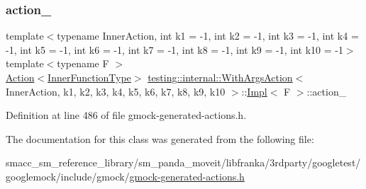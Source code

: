 \subsubsection{\texorpdfstring{action\+\_\+}{action\_}}
{\footnotesize\ttfamily template$<$typename Inner\+Action, int k1 = -\/1, int k2 = -\/1, int k3 = -\/1, int k4 = -\/1, int k5 = -\/1, int k6 = -\/1, int k7 = -\/1, int k8 = -\/1, int k9 = -\/1, int k10 = -\/1$>$ \\
template$<$typename F $>$ \\
\hyperlink{classtesting_1_1Action}{Action}$<$\hyperlink{classtesting_1_1internal_1_1WithArgsAction_1_1Impl_a19859cc3f545dc2a988638d4c2ca1fee}{Inner\+Function\+Type}$>$ \hyperlink{classtesting_1_1internal_1_1WithArgsAction}{testing\+::internal\+::\+With\+Args\+Action}$<$ Inner\+Action, k1, k2, k3, k4, k5, k6, k7, k8, k9, k10 $>$\+::\hyperlink{classtesting_1_1internal_1_1WithArgsAction_1_1Impl}{Impl}$<$ F $>$\+::action\+\_\+\hspace{0.3cm}{\ttfamily [private]}}



Definition at line 486 of file gmock-\/generated-\/actions.\+h.



The documentation for this class was generated from the following file\+:\begin{DoxyCompactItemize}
\item 
smacc\+\_\+sm\+\_\+reference\+\_\+library/sm\+\_\+panda\+\_\+moveit/libfranka/3rdparty/googletest/googlemock/include/gmock/\hyperlink{gmock-generated-actions_8h}{gmock-\/generated-\/actions.\+h}\end{DoxyCompactItemize}
